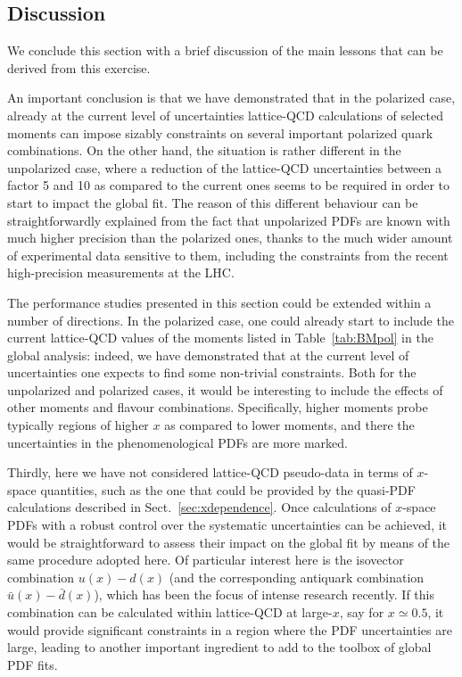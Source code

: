 \subsection{Discussion}

We conclude this section with a brief discussion of the main lessons that
can be derived from this exercise.

An important conclusion is that we have demonstrated that in the polarized case,
already at the current level of uncertainties lattice-QCD calculations of
selected moments can impose sizably constraints on several
important polarized quark combinations.
%
On the other hand, the situation is rather different in the unpolarized case,
where a reduction of the lattice-QCD uncertainties between a factor 5 and 10 as compared
to the current ones seems to be required in order to start to impact the global
fit.
%
The reason of this different behaviour can be straightforwardly explained from
the fact that unpolarized PDFs are known with much higher precision than the polarized
ones, thanks to the much wider amount of experimental data sensitive to them,
including the constraints from the recent high-precision measurements at the
LHC.

The performance studies presented in this section could be extended within
a number of directions.
%
In the polarized case, one could already start to include the current lattice-QCD
values of the moments listed in Table~\ref{tab:BMpol} in the global analysis: indeed,
we have demonstrated that at the current level of uncertainties one expects
to find some non-trivial constraints.
%
Both for the unpolarized and polarized cases, it would be interesting to include the effects
of other moments and flavour combinations.
%
Specifically, higher moments probe typically regions of higher $x$ as compared
to lower moments, and there the uncertainties in the phenomenological PDFs are
more marked.


Thirdly, here we have not considered lattice-QCD pseudo-data in terms of $x$-space
quantities, such as the one that could be provided by the quasi-PDF calculations
described in Sect.~\ref{sec:xdependence}.
%
Once calculations of $x$-space PDFs with a robust control over the systematic
uncertainties can be achieved, it would be straightforward to assess their
impact on the global fit by means of the same procedure adopted here.
%
Of particular interest here is the isovector combination $u(x)-d(x)$
(and the corresponding antiquark combination $\bar{u}(x)-\bar{d}(x)$), which
has been the focus of intense research recently.
%
If this combination can be calculated within lattice-QCD at large-$x$,
say for $x\simeq 0.5$, it would
provide significant constraints in a region where the PDF uncertainties are large,
leading to another important ingredient to add to the toolbox
of global PDF fits.

